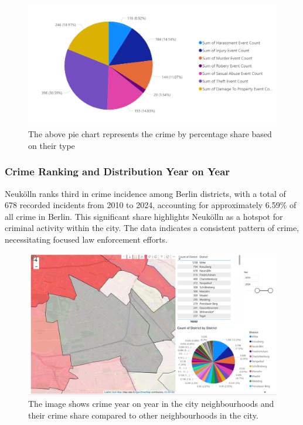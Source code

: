 \begin{figure}[h]
\includegraphics[width=\textwidth]{./figures/intro_rishabh/1_1.png}
    \caption{The above pie chart represents the crime by percentage share based on their type}
    \label{fig:districts}
\end{figure}

\subsubsection{Crime Ranking and Distribution Year on Year}
Neukölln ranks third in crime incidence among Berlin districts, with a total of 678 recorded incidents from 2010 to 2024, accounting for approximately 6.59\% of all crime in Berlin. This significant share highlights Neukölln as a hotspot for criminal activity within the city. The data indicates a consistent pattern of crime, necessitating focused law enforcement efforts.

\begin{figure}[h]
\includegraphics[width=\textwidth]{./figures/intro_rishabh/1_2.jpg}
    \caption{The image shows crime year on year in the city neighbourhoods and their crime share compared to other neighbourhoods in the city.}
    \label{fig:districts}
\end{figure}

